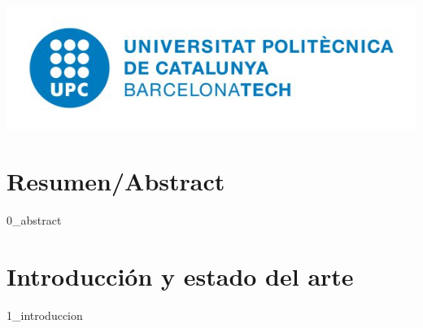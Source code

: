 \documentclass[13pt]{article}
\newcommand\blankpage{%
    \null
    \thispagestyle{empty}%
    \addtocounter{page}{-1}%
    \newpage}
\begin{document}
\begin{titlepage}



\includegraphics[scale=0.7]{logo_upc.png}\\[1cm] %
 

\vfill %
\afterpage{\blankpage}

\end{titlepage}

\section{Resumen/Abstract}
{0_abstract}
\newpage

\tableofcontents %

\newpage
\section{Introducción y estado del arte}
{1_introduccion}
\afterpage{\blankpage}
\end{document}
